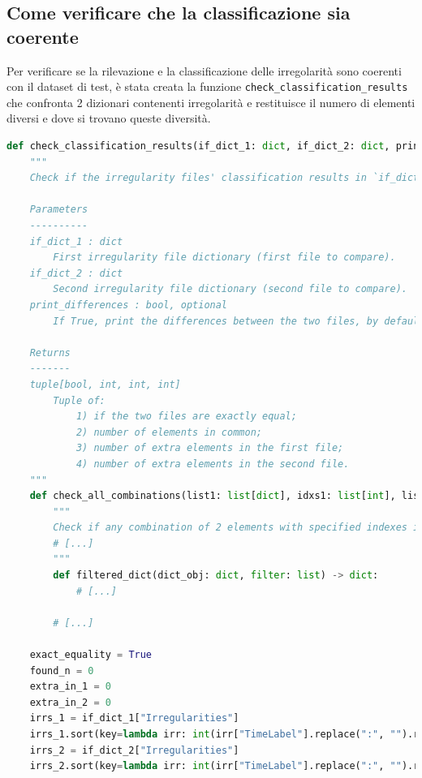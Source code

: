 \subsection{Come verificare che la classificazione sia coerente} \label{ssec:audio-analyser-classificazione}    %
Per verificare se la rilevazione e la classificazione delle irregolarità sono coerenti con il dataset di test, è stata creata la funzione \verb|check_classification_results| che confronta 2 dizionari contenenti irregolarità e restituisce il numero di elementi diversi e dove si trovano queste diversità.
\begin{lstlisting}[language=Python]
def check_classification_results(if_dict_1: dict, if_dict_2: dict, print_differences: bool = False) -> (bool, int, int, int):
    """
    Check if the irregularity files' classification results in `if_dict_1` are exactly equal to `if_dict_2`.

    Parameters
    ----------
    if_dict_1 : dict
        First irregularity file dictionary (first file to compare).
    if_dict_2 : dict
        Second irregularity file dictionary (second file to compare).
    print_differences : bool, optional
        If True, print the differences between the two files, by default False.

    Returns
    -------
    tuple[bool, int, int, int]
        Tuple of:
            1) if the two files are exactly equal;
            2) number of elements in common;
            3) number of extra elements in the first file;
            4) number of extra elements in the second file.
    """
    def check_all_combinations(list1: list[dict], idxs1: list[int], list2: list[dict], idxs2: list[int]) -> (int | None, int | None):
        """
        Check if any combination of 2 elements with specified indexes in two different lists is equal and return the indexes of the first equal elements found.
        # [...]
        """
        def filtered_dict(dict_obj: dict, filter: list) -> dict:
            # [...]

        # [...]

    exact_equality = True
    found_n = 0
    extra_in_1 = 0
    extra_in_2 = 0
    irrs_1 = if_dict_1["Irregularities"]
    irrs_1.sort(key=lambda irr: int(irr["TimeLabel"].replace(":", "").replace(".", "")))  # FIXME workaround for ":" timelabel problem from video analyser
    irrs_2 = if_dict_2["Irregularities"]
    irrs_2.sort(key=lambda irr: int(irr["TimeLabel"].replace(":", "").replace(".", "")))


\end{lstlisting}
